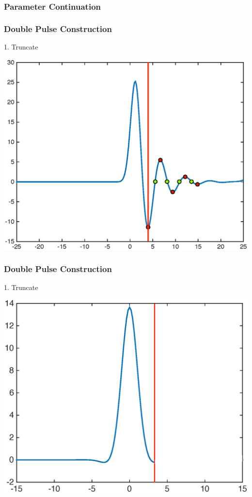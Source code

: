 \documentclass[16pt]{beamer}
\begin{document}
\begin{frame}
	\frametitle{Parameter Continuation}
	\begin{center}
	\end{center}
\end{frame}

\begin{frame}
	\frametitle{Double Pulse Construction}
	1. Truncate
	\begin{center}
	\includegraphics[width=0.8\linewidth]{images/singlepulsemagtailcut}
	\end{center}

\end{frame}

\begin{frame}
	\frametitle{Double Pulse Construction}
	1. Truncate
	\begin{center}
	\includegraphics[width=0.8\linewidth]{images/single}
	\end{center}
\end{frame}
\end{document}
